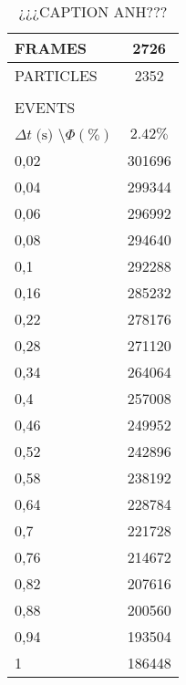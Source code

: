 \begin{table}[H]
	\begin{tabular}{ll}
		\hline
		\multicolumn{1}{|l|}{FRAMES} & \multicolumn{1}{c|}{2726} \\ \hline
		\multicolumn{1}{|l|}{PARTICLES} & \multicolumn{1}{c|}{2352} \\ \hline
		&  \\ \cline{1-1}
		\multicolumn{1}{|l|}{EVENTS} &  \\ \hline
		\multicolumn{1}{|l|}{$\Delta t \; \textrm{(s)}$ \textbackslash $\Phi (\%)$} & \multicolumn{1}{c|}{$2.42\%$} \\ \hline
		\multicolumn{1}{|l|}{0,02} & \multicolumn{1}{c|}{301696} \\ \hline
		\multicolumn{1}{|l|}{0,04} & \multicolumn{1}{c|}{299344} \\ \hline
		\multicolumn{1}{|l|}{0,06} & \multicolumn{1}{c|}{296992} \\ \hline
		\multicolumn{1}{|l|}{0,08} & \multicolumn{1}{c|}{294640} \\ \hline
		\multicolumn{1}{|l|}{0,1}  & \multicolumn{1}{c|}{292288} \\ \hline
		\multicolumn{1}{|l|}{0,16} & \multicolumn{1}{c|}{285232} \\ \hline
		\multicolumn{1}{|l|}{0,22} & \multicolumn{1}{c|}{278176} \\ \hline
		\multicolumn{1}{|l|}{0,28} & \multicolumn{1}{c|}{271120} \\ \hline
		\multicolumn{1}{|l|}{0,34} & \multicolumn{1}{c|}{264064} \\ \hline
		\multicolumn{1}{|l|}{0,4}  & \multicolumn{1}{c|}{257008} \\ \hline
		\multicolumn{1}{|l|}{0,46} & \multicolumn{1}{c|}{249952} \\ \hline
		\multicolumn{1}{|l|}{0,52} & \multicolumn{1}{c|}{242896} \\ \hline
		\multicolumn{1}{|l|}{0,58} & \multicolumn{1}{c|}{238192} \\ \hline
		\multicolumn{1}{|l|}{0,64} & \multicolumn{1}{c|}{228784} \\ \hline
		\multicolumn{1}{|l|}{0,7}  & \multicolumn{1}{c|}{221728} \\ \hline
		\multicolumn{1}{|l|}{0,76} & \multicolumn{1}{c|}{214672} \\ \hline
		\multicolumn{1}{|l|}{0,82} & \multicolumn{1}{c|}{207616} \\ \hline
		\multicolumn{1}{|l|}{0,88} & \multicolumn{1}{c|}{200560} \\ \hline
		\multicolumn{1}{|l|}{0,94} & \multicolumn{1}{c|}{193504} \\ \hline
		\multicolumn{1}{|l|}{1}    & \multicolumn{1}{c|}{186448} \\ \hline
	\end{tabular}
	\caption{¿¿¿CAPTION ANH???}
	\label{table_ANH}
\end{table}

